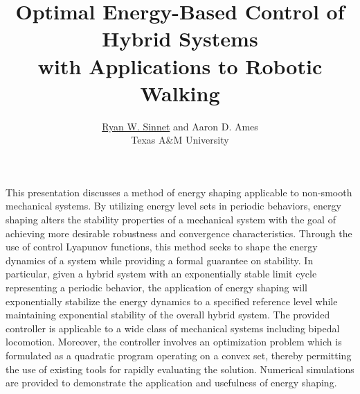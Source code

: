 \documentclass[english]{article}
\begin{document}

\title{Optimal Energy-Based Control of Hybrid Systems\\ with Applications to
  Robotic Walking}

\author{\underline{Ryan W. Sinnet} and Aaron D. Ames \\
  Texas A\&M University}%


\date{}
\maketitle
\thispagestyle{empty}

    This presentation discusses a method of energy shaping applicable to non-smooth
    mechanical systems.
    By utilizing energy level sets in periodic behaviors, energy shaping
    alters the stability properties of a mechanical system with the goal of
    achieving more desirable robustness and convergence characteristics.
    Through the use of control Lyapunov functions, this method seeks to shape
    the energy dynamics of a system while providing a formal guarantee on stability.
    In particular, given a hybrid system with an exponentially stable limit
    cycle representing a periodic behavior, the application of energy shaping
    will exponentially stabilize the energy dynamics to a specified reference
    level while maintaining exponential stability of the overall hybrid system.
    The provided controller is applicable to a wide class of mechanical systems
    including bipedal locomotion.
    Moreover, the controller involves an optimization problem which is
    formulated as a quadratic program operating on a convex set, thereby
    permitting the use of existing tools for rapidly evaluating the solution.
    Numerical simulations are provided to demonstrate the application and
    usefulness of energy shaping.
 \cite{Sinnet2014}



\end{document}

